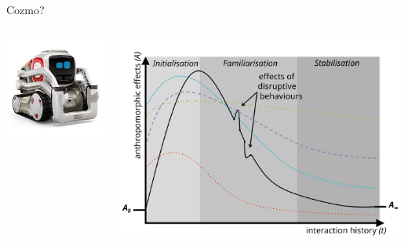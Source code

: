 \documentclass[compress]{beamer}
\begin{document}
\begin{frame}{Cozmo?}

    \begin{columns}
        \begin{column}{0.4\linewidth}
            \begin{center}
                \includegraphics[width=0.8\linewidth]{cozmo}
            \end{center}
        \end{column}
        \begin{column}{0.6\linewidth}
            \begin{center}
                \includegraphics[width=\linewidth]{dynamics-3}
            \end{center}
        \end{column}
    \end{columns}
\end{frame}
\end{document}
